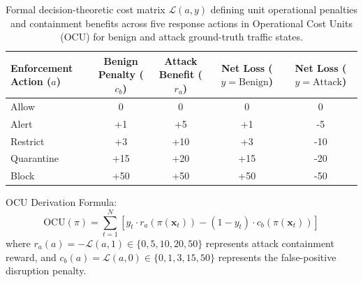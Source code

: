 \documentclass[journal,10pt,onecolumn]{IEEEtran}
\begin{document}
\begin{table}[t]
\caption{Formal decision-theoretic cost matrix $\mathcal{L}(a, y)$ defining unit operational penalties and containment benefits across five response actions in Operational Cost Units (OCU) for benign and attack ground-truth traffic states.}
\label{tab:cost_matrix}
\centering
\small
\begin{tabular}{lcccc}
\toprule
\textbf{Enforcement Action ($a$)} & \textbf{Benign Penalty ($c_b$)} & \textbf{Attack Benefit ($r_a$)} & \textbf{Net Loss ($y=\text{Benign}$)} & \textbf{Net Loss ($y=\text{Attack}$)} \\
\midrule
Allow & 0 & 0 & 0 & 0 \\
Alert & +1 & +5 & +1 & -5 \\
Restrict & +3 & +10 & +3 & -10 \\
Quarantine & +15 & +20 & +15 & -20 \\
Block & +50 & +50 & +50 & -50 \\
\bottomrule
\end{tabular}
\end{table}

OCU Derivation Formula:
$$\text{OCU}(\pi) = \sum_{t=1}^N \left[ y_t \cdot r_a(\pi(\mathbf{x}_t)) - (1 - y_t) \cdot c_b(\pi(\mathbf{x}_t)) \right]$$
where $r_a(a) = -\mathcal{L}(a, 1) \in \{0, 5, 10, 20, 50\}$ represents attack containment reward, and $c_b(a) = \mathcal{L}(a, 0) \in \{0, 1, 3, 15, 50\}$ represents the false-positive disruption penalty.
\end{document}

